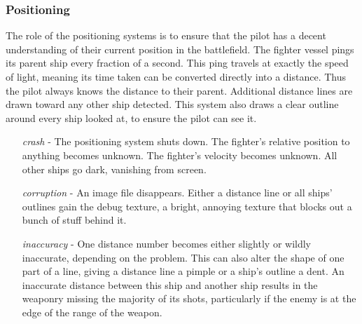 \documentclass[a4paper]{article}
\begin{document}
\hspace{-18pt} \subsubsection{Positioning} \label{fighter_positioning} \vspace{-0.2cm}
The role of the positioning systems is to ensure that the pilot has a decent understanding of their current position in the battlefield. The fighter vessel pings its parent ship every fraction of a second. This ping travels at exactly the speed of light, meaning its time taken can be converted directly into a distance. Thus the pilot always knows the distance to their parent. Additional distance lines are drawn toward any other ship detected. This system also draws a clear outline around every ship looked at, to ensure the pilot can see it.
\begin{enumerate}[leftmargin=2cm]
\item [\textit{crash}] - The positioning system shuts down. The fighter's relative position to anything becomes unknown. The fighter's velocity becomes unknown. All other ships go dark, vanishing from screen.
\item [\textit{corruption}] - An image file disappears. Either a distance line or all ships' outlines gain the debug texture, a bright, annoying texture that blocks out a bunch of stuff behind it.
\item [\textit{inaccuracy}] - One distance number becomes either slightly or wildly inaccurate, depending on the problem. This can also alter the shape of one part of a line, giving a distance line a pimple or a ship's outline a dent. An inaccurate distance between this ship and another ship results in the weaponry missing the majority of its shots, particularly if the enemy is at the edge of the range of the weapon.
\end{enumerate}
\end{document}
